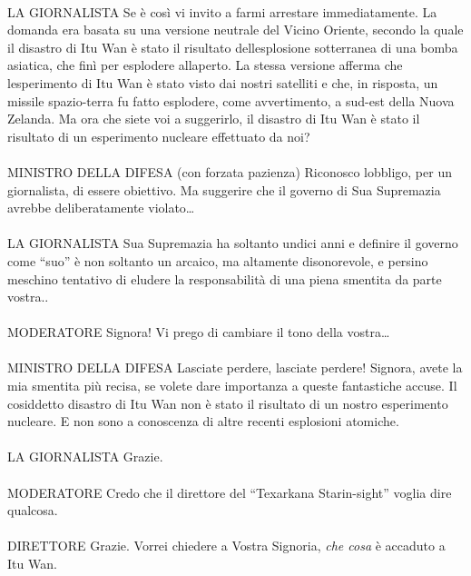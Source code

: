\leavevmode\\
LA GIORNALISTA Se è così vi invito a farmi arrestare immediatamente. La
domanda era basata su una versione neutrale del Vicino Oriente, secondo
la quale il disastro di Itu Wan è stato il risultato
dell\textquotesingle esplosione sotterranea di una bomba asiatica, che
finì per esplodere all\textquotesingle aperto. La stessa versione
afferma che l\textquotesingle esperimento di Itu Wan è stato visto dai
nostri satelliti e che, in risposta, un missile spazio-terra fu fatto
esplodere, come avvertimento, a sud-est della Nuova Zelanda. Ma ora che
siete voi a suggerirlo, il disastro di Itu Wan è stato il risultato di
un esperimento nucleare effettuato da noi?
\leavevmode\\
\leavevmode\\
MINISTRO DELLA DIFESA (con forzata pazienza) Riconosco
l\textquotesingle obbligo, per un giornalista, di essere obiettivo. Ma
suggerire che il governo di Sua Supremazia avrebbe deliberatamente
violato\ldots{}
\leavevmode\\
\leavevmode\\
LA GIORNALISTA Sua Supremazia ha soltanto undici anni e definire il
governo come ``suo'' è non soltanto un arcaico, ma altamente
disonorevole, e persino meschino tentativo di eludere la responsabilità
di una piena smentita da parte vostra..
\leavevmode\\
\leavevmode\\
MODERATORE Signora! Vi prego di cambiare il tono della vostra\ldots{}
\leavevmode\\
\leavevmode\\
MINISTRO DELLA DIFESA Lasciate perdere, lasciate perdere! Signora, avete
la mia smentita più recisa, se volete dare importanza a queste
fantastiche accuse. Il cosiddetto disastro di Itu Wan non è stato il
risultato di un nostro esperimento nucleare. E non sono a conoscenza di
altre recenti esplosioni atomiche.
\leavevmode\\
\leavevmode\\
LA GIORNALISTA Grazie.
\leavevmode\\
\leavevmode\\
MODERATORE Credo che il direttore del ``Texarkana Starin-sight'' voglia
dire qualcosa.
\leavevmode\\
\leavevmode\\
DIRETTORE Grazie. Vorrei chiedere a Vostra Signoria, \emph{che cosa} è
accaduto a Itu Wan.
\leavevmode\\
\leavevmode\\
